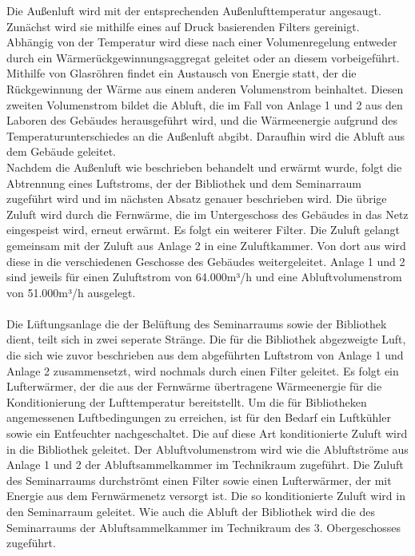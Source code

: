 Die Außenluft wird mit der entsprechenden Außenlufttemperatur angesaugt. Zunächst wird sie mithilfe eines auf Druck basierenden Filters gereinigt. Abhängig von der Temperatur wird diese nach einer Volumenregelung entweder durch ein Wärmerückgewinnungsaggregat geleitet oder an diesem vorbeigeführt. Mithilfe von Glasröhren findet ein Austausch von Energie statt, der die Rückgewinnung der Wärme aus einem anderen Volumenstrom beinhaltet. Diesen zweiten Volumenstrom bildet die Abluft, die im Fall von Anlage 1 und 2 aus den Laboren des Gebäudes herausgeführt wird, und die Wärmeenergie aufgrund des Temperaturunterschiedes an die Außenluft abgibt. Daraufhin wird die Abluft aus dem Gebäude geleitet. \\
Nachdem die Außenluft wie beschrieben behandelt und erwärmt wurde, folgt die Abtrennung eines Luftstroms, der der Bibliothek und dem Seminarraum zugeführt wird und im nächsten Absatz genauer beschrieben wird. Die übrige Zuluft wird durch die Fernwärme, die im Untergeschoss des Gebäudes in das Netz eingespeist wird, erneut erwärmt. Es folgt ein weiterer Filter. Die Zuluft gelangt gemeinsam mit der Zuluft aus Anlage 2 in eine Zuluftkammer. Von dort aus wird diese in die verschiedenen Geschosse des Gebäudes weitergeleitet. Anlage 1 und 2 sind jeweils für einen Zuluftstrom von 64.000m³/h und eine Abluftvolumenstrom von 51.000m³/h ausgelegt.\\
\\
Die Lüftungsanlage die der Belüftung des Seminarraums sowie der Bibliothek dient, teilt sich in zwei seperate Stränge. Die für die Bibliothek abgezweigte Luft, die sich wie zuvor beschrieben aus dem abgeführten Luftstrom von Anlage 1 und Anlage 2 zusammensetzt, wird nochmals durch einen Filter geleitet. Es folgt ein Lufterwärmer, der die aus der Fernwärme übertragene Wärmeenergie für die Konditionierung der Lufttemperatur bereitstellt. Um die für Bibliotheken angemessenen Luftbedingungen zu erreichen, ist für den Bedarf ein Luftkühler sowie ein Entfeuchter nachgeschaltet. Die auf diese Art konditionierte Zuluft wird in die Bibliothek geleitet. Der Abluftvolumenstrom wird wie die Abluftströme aus Anlage 1 und 2 der Abluftsammelkammer im Technikraum zugeführt. 
Die Zuluft des Seminarraums durchströmt einen Filter sowie einen Lufterwärmer, der mit Energie aus dem Fernwärmenetz versorgt ist. Die so konditionierte Zuluft wird in den Seminarraum geleitet.  Wie auch die Abluft der Bibliothek wird die des Seminarraums der Abluftsammelkammer im Technikraum des 3. Obergeschosses zugeführt.\\
